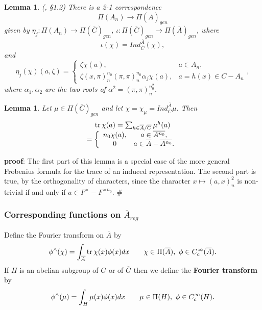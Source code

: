\documentclass[twocolumn,10pt]{article}
\newtheorem{lemma}[theorem]{Lemma}
\begin{document}
\begin{lemma}
(\cite{Mo2}, \S 1.2)
There is a 2-1 correspondence
\[
\Pi(A_n)\rightarrow \Pi(\overline{A})_{gen}
\]
given by
$\eta_j :\Pi(A_n)\rightarrow \Pi(\overline{C})_{gen}$,
$\iota :\Pi(\overline{C})_{gen}\rightarrow \Pi(\overline{A})_{gen}$,
where 
\[
\iota(\chi)=
Ind_{\overline{C}}^{\overline{A}}(\chi),
\]
and 
\[
\eta_j(\chi)(a,\zeta)=
\left\{
\begin{array}{cc}
\zeta \chi(a), &a\in A_n,\\
\zeta (x,\pi)_n^{n_0}(\pi,\pi)_n^{n_0}\alpha_j\chi(a), 
&a=h(x)\in C-A_n
\end{array},
\right.
\]
where $\alpha_1,\alpha_2$ are the two roots of 
$\alpha^2 =(\pi,\pi)_n^{n_0^2}$.
\end{lemma}

\begin{lemma}
Let $\mu\in \Pi(\overline{C})_{gen}$ and let
$\chi=\chi_\mu =Ind_{\overline{C}}^{\overline{A}}\mu$.
Then 
\begin{equation}
\begin{array}{c}
{\rm tr}\,\chi (a)=\sum_{h\in \overline{A}/\overline{C}}\mu ^h(a)\\
=\left\{
\begin{array}{cc}
n_0\chi(a),& a\in \overline{A^{n_0}},\\
0& a\in \overline{A}-\overline{A^{n_0}}.
\end{array}
\right.
\end{array}
\end{equation}
\label{lemma:chi}
\end{lemma}

{\bf proof}: The first part of this lemma is a special case of the 
more general
Frobenius formula for the trace of an induced representation.
The second part is true, by the orthogonality
of characters, since the character $x\longmapsto (a,x)_n^2$ is non-trivial
if and only if $a\in F^{\times}-F^{\times n_0}$. $\#$


\subsubsection{Corresponding functions on $\overline{A}_{reg}$}

\label{subsubsec:4.2.2}

Define the Fourier transform on 
$\overline{A}$ by
\[
\phi ^{\wedge }(\chi )=\int_{\overline{A}}
{\rm tr}\,\chi (x)\phi (x)dx \\ 
\ \ \ \ \ \ \chi \in \Pi (\overline{A}),
\ \phi\in C_c^\infty(\overline{A}).
\]
If $H$ is an abelian subgroup of $G$ or
of $\overline{G}$ then we define the {\bf Fourier transform}
by
\[
\phi ^{\wedge }(\mu )=\int_{H}
\mu (x)\phi (x)dx \\ 
\ \ \ \ \ \ \mu \in \Pi (H),
\ \phi\in C_c^\infty(H).
\]
\end{document}
